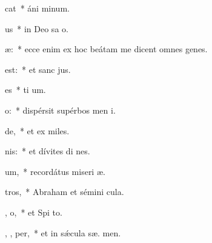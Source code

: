 \item {}cat~* áni  minum.
\item {}   us~* in Deo sa o.
\item {}    æ:~* ecce enim ex hoc beátam me dicent omnes genes.
\item {}      est:~* et sanc  jus.
\item {}      es~* ti um.
\item {}    o:~* dispérsit supérbos men  i.
\item {}   de,~* et ex miles.
\item {}  nis:~* et dívites di nes.
\item {}   um,~* recordátus miseri æ.
\item {}     tros,~* Abraham et sémini   cula.
\item {} ,  o,~* et Spi to.
\item {}   ,  ,  per,~* et in sǽcula sæ. men.
